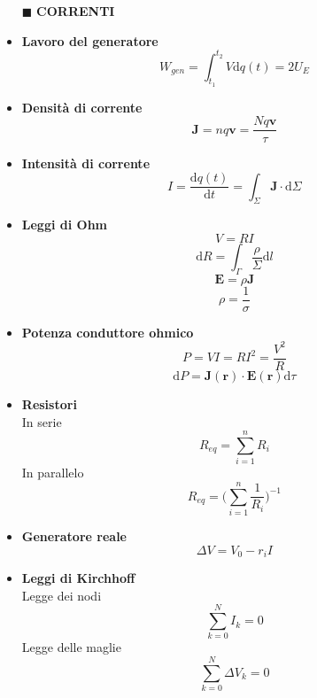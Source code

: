 \documentclass{book}
\newcommand{\g}{\textbf}
\newcommand{\h}{\mathbf}
\newcommand{\e}{\begin{equation}}
\newcommand{\ex}{\end{equation} }
\renewcommand{\it}{\item[$\cdot$]}
\begin{document}
\begin{multicols}{4}
\begin{itemize}
\hline
\item [$\blacksquare$] \g{CORRENTI}
    \it \g{Lavoro del generatore}
        \e{W_{gen}=\int_{t_1}^{t_2} V \mathrm{d}q(t)=2U_E} \ex
    \it \g{Densità di corrente}
        \e{\h{J}=nq\h{v}=\frac{Nq\h{v}}{\tau}} \ex
    \it \g{Intensità di corrente}
        \e{I=\frac{\mathrm{d} q(t)}{\mathrm{d} t}=\int_\Sigma \h{J}\cdot \mathrm{d}\Sigma} \ex
    \it \g{Leggi di Ohm}
        \e{V=RI} \ex
        \e{\mathrm{d}R=\int_\Gamma\frac{\rho}{\Sigma}\mathrm{d}l} \ex
        \e{\h{E}=\rho\h{J}} \ex
        \e{\rho=\frac{1}{\sigma}} \ex
    \it \g{Potenza conduttore ohmico}
        \e{P=VI=RI^2=\frac{V^2}{R}} \ex
        \e{\mathrm{d}P=\h{J}(\h{r})\cdot\h{E}(\h{r})\mathrm{d}\tau} \ex
    \it \g{Resistori} \\
    In serie
        \e{R_{eq}= \sum_{i=1}^n R_i} \ex
    In parallelo
        \e{R_{eq}=\biggl( \sum_{i=1}^n \frac{1}{R_i} \biggr)^{-1}} \ex
    \it \g{Generatore reale} \\
        \e{\Delta V=V_0-r_i I}\ex
    \it \g{Leggi di Kirchhoff}\\
    Legge dei nodi
        \e{\sum_{k=0}^NI_k=0}\ex
    Legge delle maglie
        \e{\sum_{k=0}^N\Delta V_k=0}\ex


\end{itemize}
\end{multicols}
\end{document}
